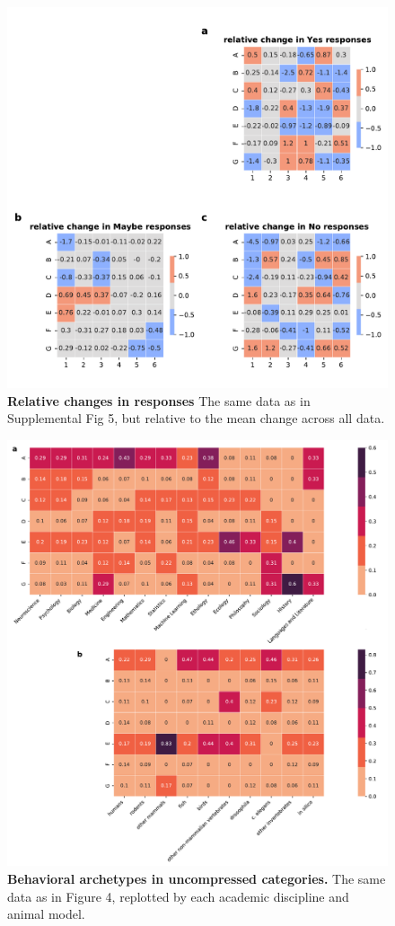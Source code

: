 \documentclass[a4paper, 11pt]{article}
\begin{document}
\begin{figure}
\centerline{\includegraphics[width=\textwidth]{supp_fig6.pdf}}
\caption{\textbf{Relative changes in responses} The same data as in Supplemental Fig 5, but relative to the mean change across all data.}
\end{figure}
\newpage

\begin{figure}
\centerline{\includegraphics[width=\textwidth]{supp_fig7.pdf}}
\caption{\textbf{Behavioral archetypes in uncompressed categories.} The same data as in Figure 4, replotted by each academic discipline and animal model.}
\end{figure}
\newpage

{\footnotesize }
% 

\end{document}
